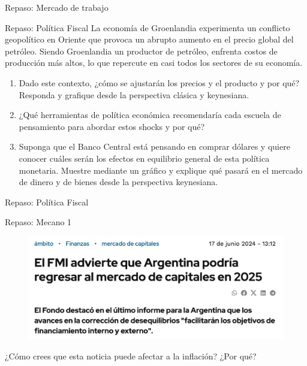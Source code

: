 \documentclass{beamer}
\begin{document}
\begin{frame}{Repaso: Mercado de trabajo}
    
\end{frame}

\begin{frame}{Repaso: Política Fiscal}
    La economía de Groenlandia experimenta un conflicto geopolítico en Oriente que provoca un abrupto aumento en el precio global del petróleo. Siendo Groenlandia un productor de petróleo, enfrenta costos de producción más altos, lo que repercute en casi todos los sectores de su economía.
    \begin{enumerate}
        \item Dado este contexto, ¿cómo se ajustarán los precios y el producto y por qué? Responda y grafique desde la perspectiva clásica y keynesiana.
        \item ¿Qué herramientas de política económica recomendaría cada escuela de pensamiento para abordar estos shocks y por qué?
        \item Suponga que el Banco Central está pensando en comprar dólares y quiere conocer cuáles serán los efectos en equilibrio general de esta política monetaria. Muestre mediante un gráfico y explique qué pasará en el mercado de dinero y de bienes desde la perspectiva keynesiana. 
    \end{enumerate}
\end{frame}

\begin{frame}{Repaso: Política Fiscal}
    
\end{frame}

\begin{frame}{Repaso: Mecano 1}

    \begin{figure}[h!]
        \centering
        \includegraphics[width=1\textwidth]{../Figures/ejercicio_noticia1.jpg}
    \end{figure}
    ¿Cómo crees que esta noticia puede afectar a la inflación? ¿Por qué?
\end{frame}
\end{document}
